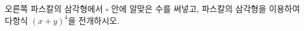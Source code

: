 \noindent\begin{minipage}[t]{0.58\linewidth}\vspace{0pt}\raggedright 오른쪽 파스칼의 삼각형에서 $\square$ 안에 알맞은 수를 써넣고, 파스칼의 삼각형을 이용하여 다항식 $(x+y)^4$을 전개하시오.\end{minipage}\hfill\begin{minipage}[t]{0.4\linewidth}\vspace{0pt}\centering \resizebox{\ifdim\width>\linewidth\linewidth\else\width\fi}{!}{}\end{minipage}\par
